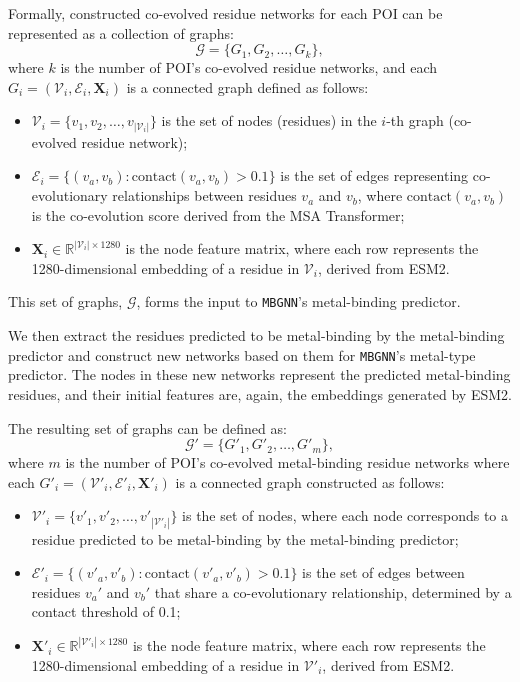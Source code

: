\documentclass[letterpaper, 10 pt, conference]{ieeeconf}
\begin{document}
Formally, constructed co-evolved residue networks for each POI can be represented as a collection of graphs:
\begin{equation}
    \mathcal{G} = \{G_1, G_2, \dots, G_k\},
\end{equation}
where $k$ is the number of POI's co-evolved residue networks, and each \( G_i = (\mathcal{V}_i, \mathcal{E}_i, \mathbf{X}_i) \) is a connected graph defined as follows:
\begin{itemize}
    \item \( \mathcal{V}_i = \{v_1, v_2, \dots, v_{|\mathcal{V}_i|}\} \) is the set of nodes (residues) in the \(i\)-th graph (co-evolved residue network);
    \item \( \mathcal{E}_i = \{(v_a, v_b) : \text{contact}(v_a,v_b) > 0.1\} \) is the set of edges representing co-evolutionary relationships between residues \( v_a \) and \( v_b \), where \(\text{contact}(v_a,v_b)\) is the co-evolution score derived from the MSA Transformer;
    \item \( \mathbf{X}_i \in \mathbb{R}^{|\mathcal{V}_i| \times 1280} \) is the node feature matrix, where each row represents the 1280-dimensional embedding of a residue in \( \mathcal{V}_i \), derived from ESM2.
\end{itemize}

This set of graphs, \(\mathcal{G}\), forms the input to \texttt{MBGNN}'s metal-binding predictor.

We then extract the residues predicted to be metal-binding by the metal-binding predictor and construct new networks based on them for \texttt{MBGNN}'s metal-type predictor. The nodes in these new networks represent the predicted metal-binding residues, and their initial features are, again, the embeddings generated by ESM2.

The resulting set of graphs can be defined as:
\begin{equation}
\mathcal{G}' = \{G'_1, G'_2, \dots, G'_m\},
\end{equation}
where $m$ is the number of POI's co-evolved metal-binding residue networks where each \( G'_i = (\mathcal{V'}_i, \mathcal{E'}_i, \mathbf{X}'_i) \) is a connected graph constructed as follows:
\begin{itemize}
    \item \( \mathcal{V'}_i = \{v'_1, v'_2, \dots, v'_{|\mathcal{V'}_i|}\} \) is the set of nodes, where each node corresponds to a residue predicted to be metal-binding by the metal-binding predictor;
    \item \( \mathcal{E'}_i = \{(v'_a, v'_b): \text{contact}(v'_a,v'_b) > 0.1\} \) is the set of edges between residues \( v_a' \) and \( v_b' \) that share a co-evolutionary relationship, determined by a contact threshold of 0.1;
    \item \( \mathbf{X}'_i \in \mathbb{R}^{|\mathcal{V'}_i| \times 1280} \) is the node feature matrix, where each row represents the 1280-dimensional embedding of a residue in \( \mathcal{V'}_i \), derived from ESM2.
\end{itemize}
\end{document}
